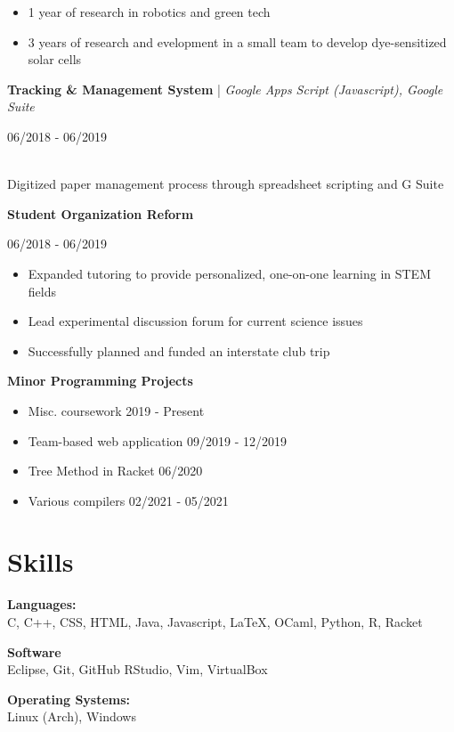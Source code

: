 \documentclass[10pt,letterpaper]{article}
\begin{document}
      \begin{itemize}
        \item 1 year of research in robotics and green tech
        \item 3 years of research and evelopment in a small team to develop dye-sensitized solar cells
      \end{itemize}
    
    \textbf{Tracking \& Management System} | \textit{Google Apps Script (Javascript), Google Suite}\hfill
      \begin{minipage}[t]{1.2in}
        06/2018 - 06/2019
      \end{minipage} \\
      Digitized paper management process through spreadsheet scripting and G Suite
    
    \textbf{Student Organization Reform}\hfill
      \begin{minipage}[t]{1.2in}
        06/2018 - 06/2019
      \end{minipage} 
      
      \begin{itemize}
        \item Expanded tutoring to provide personalized, one-on-one learning in STEM fields
        \item Lead experimental discussion forum for current science issues
        \item Successfully planned and funded an interstate club trip
      \end{itemize}
    
    \textbf{Minor Programming Projects}\hfill
    \begin{itemize}
      \item Misc. coursework \hfill 2019 - Present
      \item Team-based web application \hfill 09/2019 - 12/2019
      \item Tree Method in Racket \hfill 06/2020
      \item Various compilers \hfill 02/2021 - 05/2021
    \end{itemize}
    

  \section{Skills}
    \textbf{Languages:}\\
    C, C++, CSS, HTML, Java, Javascript, LaTeX, OCaml, Python, R, Racket
    
    \begin{minipage}[t]{2.5in}
      \textbf{Software}\\
      Eclipse, Git, GitHub RStudio, Vim, VirtualBox
    \end{minipage}\hfill
    \begin{minipage}[t]{1.6in}
      \textbf{Operating Systems:}\\
      Linux (Arch), Windows
    \end{minipage}
    
\end{document}
